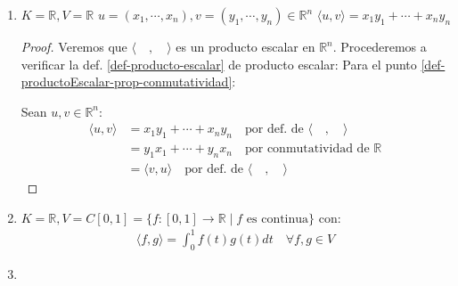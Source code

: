 \begin{example}{}{}
    \begin{enumerate}
        \item $K=\mathbb{R}, V= \mathbb{R} \, \, u = (x_1, \cdots, x_n), v=(y_1, \cdots, y_n) \in \mathbb{R}^n \, \, \langle u, v \rangle = x_1y_1 + \cdots + x_ny_n$ 
\begin{proof}
            Veremos que $\langle \quad, \quad \rangle$ es un producto escalar en $\mathbb{R}^n$. Procederemos a verificar la def. \ref{def-producto-escalar} de producto escalar:
            Para el punto \ref{def-productoEscalar-prop-conmutatividad}:

            Sean $u,v \in \mathbb{R}^n$:
            \begin{align*}
                \langle u,v \rangle &= x_1y_1 + \cdots + x_ny_n \quad \text{por def. de $\langle \quad, \quad \rangle$} \\
                &= y_1x_1 + \cdots + y_nx_n \quad \text{por conmutatividad de $\mathbb{R}$} \\
                &= \langle v,u \rangle \quad \text{por def. de $\langle \quad, \quad \rangle$}
            \end{align*}
\end{proof}
        \item $K=\mathbb{R}, V = C[0,1]= \{f:[0,1] \rightarrow \mathbb{R} \mid f \text{ es continua}\}$ con:
        \begin{align*}
            \langle f, g \rangle = \int_{0}^{1} f(t)g(t) dt \quad \forall f,g \in V
        \end{align*}
        \item 
    \end{enumerate}
\end{example}


